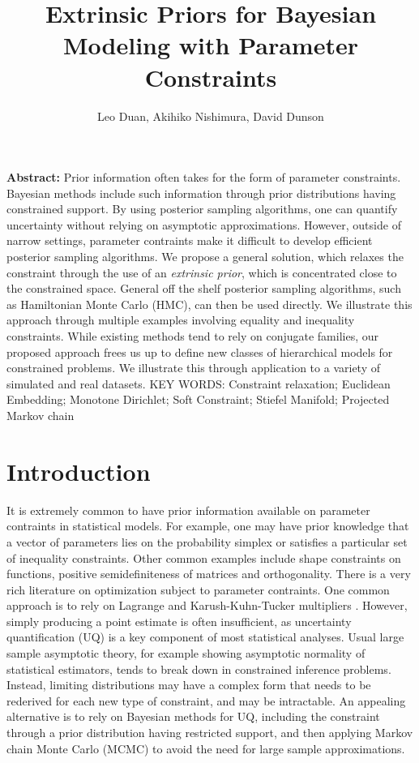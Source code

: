 \documentclass[10pt]{article}
\title{\textbf{Extrinsic Priors for Bayesian Modeling with Parameter Constraints}}
\author{Leo Duan, Akihiko Nishimura, David Dunson}
\date{}
\DeclareMathOperator{\1}{\mathbbm{1}}
\begin{document}
\maketitle
{\bf Abstract:} Prior information often takes for the form of parameter constraints. Bayesian methods include such information through prior distributions having constrained support. By using posterior sampling algorithms, one can quantify uncertainty without relying on asymptotic approximations. However, outside of narrow settings, parameter contraints make it difficult to develop efficient posterior sampling algorithms. We propose a general solution, which relaxes the constraint through the use of an {\em extrinsic prior}, which is concentrated close to the constrained space. General off the shelf posterior sampling algorithms, such as Hamiltonian Monte Carlo (HMC), can then be used directly. We illustrate this approach through multiple examples involving equality and inequality constraints. While existing methods tend to rely on conjugate families, our proposed approach frees us up to define new classes of hierarchical models for constrained problems. We illustrate this through application to a variety of simulated and real datasets.
\vskip 12pt
{\noindent KEY WORDS: Constraint relaxation; Euclidean Embedding; Monotone Dirichlet; Soft Constraint; Stiefel Manifold; Projected Markov chain}
{}


\section{Introduction}
It is extremely common to have prior information available on parameter contraints in statistical models. For example, one may have prior knowledge that a vector of parameters lies on the probability simplex or satisfies a particular set of inequality constraints. Other common examples include shape constraints on functions, positive semidefiniteness of matrices and orthogonality. There is a very rich literature on optimization subject to parameter contraints. One common approach is to rely on Lagrange and Karush-Kuhn-Tucker multipliers \citep{boyd2004convex}. However, simply producing a point estimate is often insufficient, as uncertainty quantification (UQ) is a key component of most statistical analyses. Usual large sample asymptotic theory, for example showing asymptotic normality of statistical estimators, tends to break down in constrained inference problems. Instead, limiting distributions may have a complex form that needs to be rederived for each new type of constraint, and may be intractable. An appealing alternative is to rely on Bayesian methods for UQ, including the constraint through a prior distribution having restricted support, and then applying Markov chain Monte Carlo (MCMC) to avoid the need for large sample approximations.
\end{document}
